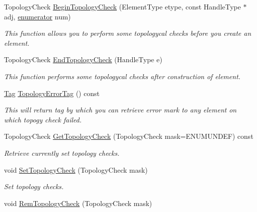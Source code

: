 \begin{DoxyCompactItemize}
\item 
Topology\-Check \hyperlink{classINMOST_1_1Mesh_a55549e9d46cd92e2f3122e1516f3c9fd}{Begin\-Topology\-Check} (Element\-Type etype, const Handle\-Type $\ast$adj, \hyperlink{classINMOST_1_1Storage_ae333dfced6fa9cfde0c8e7dcf1b0cc2b}{enumerator} num)
\begin{DoxyCompactList}\small\item\em This function allows you to perform some topologycal checks before you create an element. \end{DoxyCompactList}\item 
Topology\-Check \hyperlink{classINMOST_1_1Mesh_a1c6c26bcbe6e7a0cba093c0b8312ba04}{End\-Topology\-Check} (Handle\-Type e)
\begin{DoxyCompactList}\small\item\em This function performs some topologycal checks after construction of element. \end{DoxyCompactList}\item 
\hyperlink{classINMOST_1_1Tag}{Tag} \hyperlink{classINMOST_1_1Mesh_a72ee27b1b485c40e272f8018aa5ca0a1}{Topology\-Error\-Tag} () const 
\begin{DoxyCompactList}\small\item\em This will return tag by which you can retrieve error mark to any element on which topogy check failed. \end{DoxyCompactList}\item 
\hypertarget{classINMOST_1_1Mesh_afad6ccd8132d0aed639ef18772def9ab}{Topology\-Check \hyperlink{classINMOST_1_1Mesh_afad6ccd8132d0aed639ef18772def9ab}{Get\-Topology\-Check} (Topology\-Check mask=E\-N\-U\-M\-U\-N\-D\-E\-F) const }\label{classINMOST_1_1Mesh_afad6ccd8132d0aed639ef18772def9ab}

\begin{DoxyCompactList}\small\item\em Retrieve currently set topology checks. \end{DoxyCompactList}\item 
\hypertarget{classINMOST_1_1Mesh_af9f578239d7b369ad4b1edb69eea24d2}{void \hyperlink{classINMOST_1_1Mesh_af9f578239d7b369ad4b1edb69eea24d2}{Set\-Topology\-Check} (Topology\-Check mask)}\label{classINMOST_1_1Mesh_af9f578239d7b369ad4b1edb69eea24d2}

\begin{DoxyCompactList}\small\item\em Set topology checks. \end{DoxyCompactList}\item 
\hypertarget{classINMOST_1_1Mesh_a374a56ae3bdae9e54030c72538836c09}{void \hyperlink{classINMOST_1_1Mesh_a374a56ae3bdae9e54030c72538836c09}{Rem\-Topology\-Check} (Topology\-Check mask)}\label{classINMOST_1_1Mesh_a374a56ae3bdae9e54030c72538836c09}


\end{DoxyCompactItemize}

